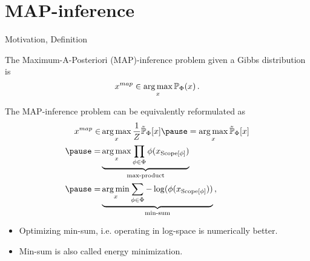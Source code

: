 \section{MAP-inference}
\begin{frame}{Motivation, Definition}
    \begin{definition}
       The Maximum-A-Posteriori (MAP)-inference problem given a Gibbs distribution is
       \begin{equation}
        x^{map} \in \argmax_x \Pb_{\Phi}(x)\,.
       \end{equation}
    \end{definition}
    \pause
    The MAP-inference problem can be equivalently reformulated as
    \begin{equation}
        \begin{aligned}
        x^{map}  
        \in & \argmax_{x} \frac{1}{Z} \tilde{\Pb}_{\Phi}[x] 
        \pause = \argmax_{x} \tilde{\Pb}_{\Phi}[x] \\
        \pause = & \underbrace{\argmax_{x} \prod_{\phi \in \Phi}\phi(x_{\Scope[\phi]})}_{\text{max-product}} \\
        \pause = & \underbrace{\argmin_{x} \sum_{\phi \in \Phi} -\log(\phi(x_{\Scope[\phi]}))}_{\text{min-sum}}\,,
        \end{aligned}
    \end{equation}
    \begin{itemize}
        \pause \item Optimizing min-sum, i.e. operating in log-space is numerically better.
        \pause \item Min-sum is also called energy minimization.
    \end{itemize}
\end{frame}

